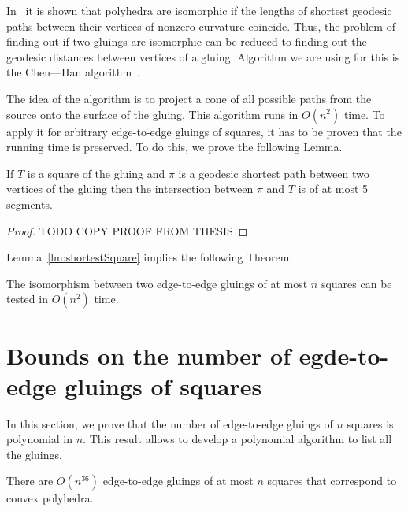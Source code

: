 \documentclass[a4paper,11pt]{article}
\begin{document}
In~\cite{DO07} it is shown that polyhedra are isomorphic if the lengths of shortest geodesic paths between their vertices of nonzero curvature coincide. Thus, the problem of finding out if two gluings are isomorphic can be reduced to finding out the geodesic distances between vertices of a gluing. Algorithm we are using for this is the Chen—Han algorithm~\cite{chen-han}.

The idea of the algorithm is to project a cone of all possible paths from the source onto the surface of the gluing. This algorithm runs in $O(n^2)$ time. To apply it for arbitrary edge-to-edge gluings of squares, it has to be proven that the running time is preserved. To do this, we prove the following Lemma.

\begin{lemma} \label{lm:shortestSquare}
	If $T$ is a square of the gluing and $\pi$ is a geodesic shortest path between two vertices of the gluing then the intersection between $\pi$ and $T$ is of at most 5 segments.
\end{lemma}

\begin{proof}
	TODO COPY PROOF FROM THESIS
\end{proof}

Lemma~\ref{lm:shortestSquare} implies the following Theorem.

\begin{theorem} \label{thm:chruntime}
	The isomorphism between two edge-to-edge gluings of at most $n$ squares can be tested in $O(n^2)$ time.
\end{theorem}

\section{Bounds on the number of egde-to-edge gluings of squares}

In this section, we prove that the number of edge-to-edge gluings of $n$ squares is polynomial in $n$. This result allows to develop a polynomial algorithm to list all the gluings.

\begin{theorem} \label{thm:n36}
	There are $O \left( n^{36} \right)$ edge-to-edge gluings of at most $n$ squares that correspond to convex polyhedra.
\end{theorem}
\end{document}
